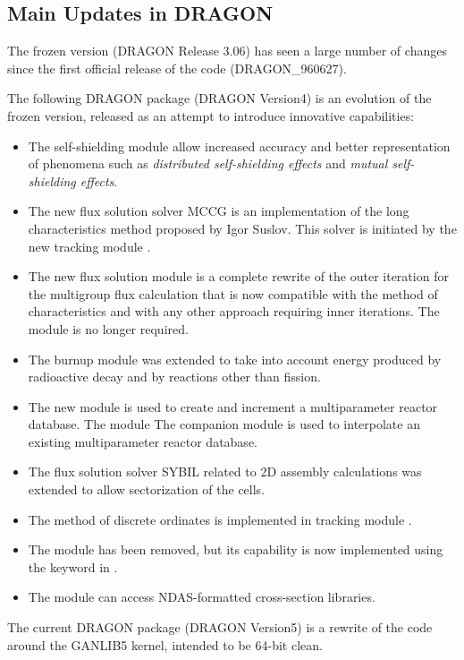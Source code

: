 \subsection{Main Updates in DRAGON}\label{sect:Updates}

The frozen version (DRAGON Release 3.06) has seen a large number of changes since
the first official release of the code (DRAGON\_960627).

\vskip 0.15cm

The following DRAGON package (DRAGON Version4) is an evolution of the frozen version,
released as an attempt to introduce innovative capabilities:

\begin{itemize}

\item The self-shielding module  allow increased accuracy and better representation
of phenomena such as {\sl distributed self-shielding effects} and {\sl mutual self-shielding effects}.

\item The new flux solution solver MCCG is an implementation of the long characteristics method proposed
by Igor Suslov. This solver is initiated by the new tracking module .

\item The new flux solution module  is a complete rewrite of the outer iteration
for the multigroup flux calculation that is now compatible with the method of characteristics and with
any other approach requiring inner iterations. The  module is no longer required.

\item The burnup module  was extended to take into account energy produced by radioactive
decay and by reactions other than fission.

\item The new module  is used to create and increment a multiparameter reactor database. The
module The companion module  is used to interpolate an existing multiparameter reactor database.

\item The flux solution solver SYBIL related to 2D assembly calculations was extended to allow
sectorization of the cells.

\item The method of discrete ordinates is implemented in tracking module .

\item The  module has been removed, but its capability is now implemented using the  keyword
in .

\item The  module can access NDAS-formatted cross-section libraries.

\end{itemize}

\vskip 0.15cm

The current DRAGON package (DRAGON Version5) is a rewrite of the code around the GANLIB5 kernel\cite{ganlib5}, intended to be 64-bit clean.
